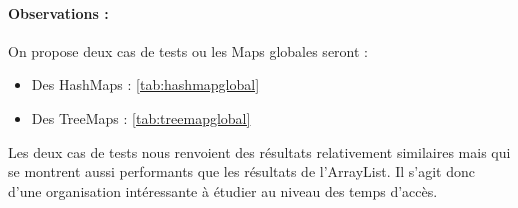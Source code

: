 \paragraph{Observations :}
On propose deux  cas de tests ou les Maps globales seront :
\begin{itemize}
  \item Des HashMaps :  \ref{tab:hashmapglobal} 
  \item Des TreeMaps :  \ref{tab:treemapglobal} 
\end{itemize}
Les deux cas de tests nous renvoient des résultats relativement similaires mais qui se montrent aussi performants que les résultats de l'ArrayList. Il s'agit donc d'une organisation intéressante à étudier au niveau des temps d'accès.



